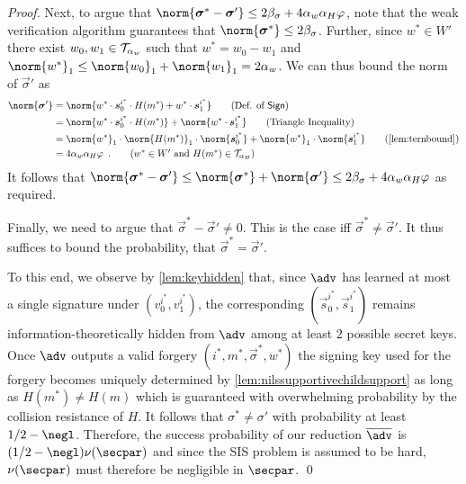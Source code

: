 \begin{proof}
  Next, to argue that $\norm{\vec{\sigma}^*-\vec{\sigma}'}\leq 2\beta_\sigma + 4\alpha_w\alpha_H\varphi$, note that the weak verification algorithm guarantees that $\norm{\vec{\sigma}^*} \leq 2\beta_\sigma$.
  Further, since $w^*\in W'$ there exist $w_0,w_1 \in \mathcal{T}_{\alpha_w}$ such that $w^* = w_0-w_1$ and $\norm{w^*}_1 \leq \norm{w_0}_1 + \norm{w_1}_1 = 2\alpha_w$.
  We can thus bound the norm of $\vec{\sigma}'$ as
  \begin{align*}
    \norm{\vec{\sigma}'} ={}& \norm{w^*\cdot\vec{s}^{i^*}_0\cdot H(m^*)+ w^*\cdot\vec{s}^{i^*}_1}\tag{Def. of $\sign$}\\
    ={}&\norm{w^*\cdot\vec{s}^{i^*}_0\cdot H(m^*)}+ \norm{w^*\cdot\vec{s}^{i^*}_1}\tag{Triangle Inequality}\\
    ={}&\norm{w^*}_1\cdot\norm{H(m^*)}_1\cdot\norm{\vec{s}^{i^*}_0} + \norm{w^*}_1\cdot\norm{\vec{s}^{i^*}_1}\tag{\autoref{lem:ternbound}}\\
    ={}&4\alpha_w\alpha_H\varphi\enspace.\tag{$w^*\in W'$ and $H(m^*)\in\tern_{\alpha_H}$}
  \end{align*}
  It follows that $\norm{\vec{\sigma}^*-\vec{\sigma}'} \leq \norm{\vec{\sigma}^*}+\norm{\vec{\sigma}'} \leq 2\beta_\sigma + 4\alpha_w\alpha_H\varphi$ as required.

  Finally, we need to argue that $\vec{\sigma}^*-\vec{\sigma}'\neq 0$.
  This is the case iff $\vec{\sigma}^* \neq \vec{\sigma}'$.
  It thus suffices to bound the probability, that $\vec{\sigma}^*=\vec{\sigma}'$.

  To this end, we observe by \autoref{lem:keyhidden} that, since $\adv$ has learned at most a single signature under $(v_0^{i^*},v_1^{i^*})$, the corresponding $(\vec{s}_0^{i^*},\vec{s}_1^{i^*})$ remains information-theoretically hidden from $\adv$ among at least 2 possible secret keys.
  Once $\adv$ outputs a valid forgery $(i^*,m^*,\vec{\sigma}^*,w^*)$ the signing key used for the forgery becomes uniquely determined by \autoref{lem:nilssupportivechildsupport} as long as $H(m^*)\neq H(m)$ which is guaranteed with overwhelming probability by the collision resistance of $H$.
  It follows that $\sigma^* \neq \sigma'$ with probability at least $1/2 - \negl$.
  Therefore, the success probability of our reduction $\sisadvkots$ is $(1/2 - \negl) \nu(\secpar)$ and since the SIS problem is assumed to be hard, $\nu(\secpar)$ must therefore be negligible in $\secpar$.
  \qed
\end{proof}

